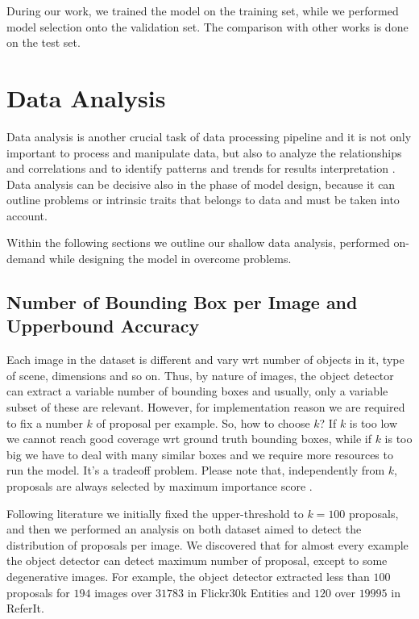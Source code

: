 During our work, we trained the model on the training set, while we
performed model selection onto the validation set. The comparison with
other works is done on the test set. 

\section{Data Analysis}
\label{sec:data-analysis}

Data analysis is another crucial task of data processing pipeline and
it is not only important to process and manipulate data, but also to
analyze the relationships and correlations and to identify patterns
and trends for results interpretation \cite{sharma2020understanding}.
Data analysis can be decisive also in the phase of model design,
because it can outline problems or intrinsic traits that belongs to
data and must be taken into account.

Within the following sections we outline our shallow data analysis,
performed on-demand while designing the model in overcome problems.

\subsection{Number of Bounding Box per Image and Upperbound Accuracy}
\label{subsec:num-of-proposals}

Each image in the dataset is different and vary wrt number of objects
in it, type of scene, dimensions and so on. Thus, by nature of images,
the object detector can extract a variable number of bounding boxes
and usually, only a variable subset of these are relevant. However,
for implementation reason we are required to fix a number $k$ of
proposal per example. So, how to choose $k$? If $k$ is too low we
cannot reach good coverage wrt ground truth bounding boxes, while if
$k$ is too big we have to deal with many similar boxes and we require
more resources to run the model. It's a tradeoff problem. Please note
that, independently from $k$, proposals are always selected by maximum
importance score \cite{ren2015faster}.

Following literature we initially fixed the upper-threshold to $k =
100$ proposals, and then we performed an analysis on both dataset
aimed to detect the distribution of proposals per image. We discovered
that for almost every example the object detector can detect maximum
number of proposal, except to some degenerative images. For example,
the object detector extracted less than $100$ proposals for $194$
images over $31783$ in Flickr30k Entities and $120$ over $19995$ in
ReferIt.

